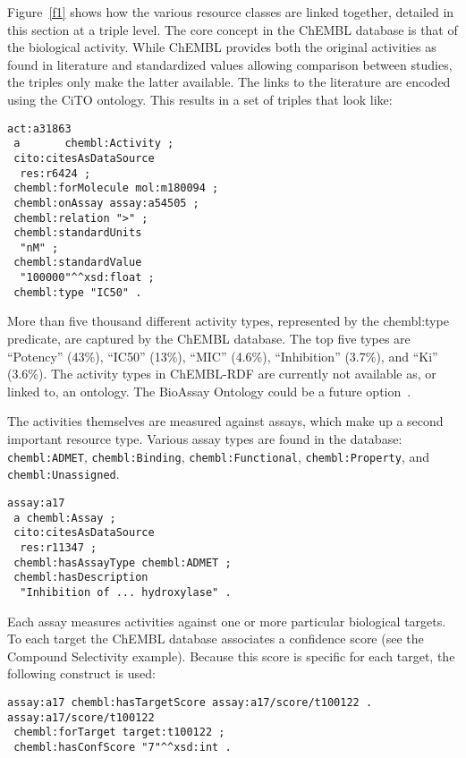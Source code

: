 \documentclass[10pt]{bmc_article}
\newenvironment{bmcformat}{\begin{raggedright}\baselineskip20pt\sloppy\setboolean{publ}{false}}{\end{raggedright}\baselineskip20pt\sloppy}
\begin{document}
\begin{bmcformat}
Figure~\ref{f1} shows how the various resource classes are linked together, detailed in
this section at a triple level.
The core concept in the ChEMBL database is that of the biological activity.
While ChEMBL provides both the original activities as found in literature
and standardized values allowing comparison between studies, the triples only
make the latter available. The links to the literature are encoded using the CiTO ontology.
This results in a set of triples that look like:

\begin{small}
\begin{verbatim}
act:a31863
 a       chembl:Activity ;
 cito:citesAsDataSource
  res:r6424 ;
 chembl:forMolecule mol:m180094 ;
 chembl:onAssay assay:a54505 ;
 chembl:relation ">" ;
 chembl:standardUnits
  "nM" ;
 chembl:standardValue
  "100000"^^xsd:float ;
 chembl:type "IC50" .
\end{verbatim}
\end{small}

More than five thousand different activity types, represented by the chembl:type predicate,
are captured by the ChEMBL database.
The top five types are ``Potency'' (43\%), ``IC50'' (13\%), ``MIC'' (4.6\%), ``Inhibition'' (3.7\%),
and ``Ki'' (3.6\%). The activity types in ChEMBL-RDF are currently not available as, or
linked to, an ontology. The BioAssay Ontology could be a future option~\cite{Visser2011}.

The activities themselves are measured against assays, which make up a second important
resource type. Various assay types are found in the database: \verb+chembl:ADMET+, \verb+chembl:Binding+,
\verb+chembl:Functional+, \verb+chembl:Property+, and \verb+chembl:Unassigned+.

\begin{small}
\begin{verbatim}
assay:a17
 a chembl:Assay ;
 cito:citesAsDataSource
  res:r11347 ;
 chembl:hasAssayType chembl:ADMET ;
 chembl:hasDescription
  "Inhibition of ... hydroxylase" .
\end{verbatim}
\end{small}

Each assay measures activities against one or more particular biological targets. To each
target the ChEMBL database associates a confidence score (see the Compound Selectivity
example). Because this score is specific
for each target, the following construct is used:

\begin{small}
\begin{verbatim}
assay:a17 chembl:hasTargetScore assay:a17/score/t100122 .
assay:a17/score/t100122
 chembl:forTarget target:t100122 ;
 chembl:hasConfScore "7"^^xsd:int .  
\end{verbatim}
\end{small}


\end{bmcformat}
\end{document}
